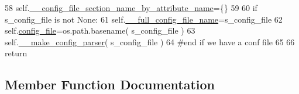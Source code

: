 \begin{DoxyCode}
58         self.\hyperlink{classnegui_1_1pginputsimupop_1_1PGInputSimuPop_acd9740f17e53a6e471d4e85565962369}{\_\_config\_file\_section\_name\_by\_attribute\_name}=\{\}
59 
60         \textcolor{keywordflow}{if} s\_config\_file \textcolor{keywordflow}{is} \textcolor{keywordflow}{not} \textcolor{keywordtype}{None}:
61             self.\hyperlink{classnegui_1_1pginputsimupop_1_1PGInputSimuPop_ad7c3feef55c16989a35f56c3e0d9943e}{\_\_full\_config\_file\_name}=s\_config\_file
62             self.\hyperlink{classnegui_1_1pginputsimupop_1_1PGInputSimuPop_af82bde7e564aee524fc30f2e06fde934}{config\_file}=os.path.basename( s\_config\_file )
63             self.\hyperlink{classnegui_1_1pginputsimupop_1_1PGInputSimuPop_a0b34c99730e86de268c5503ed226d15e}{\_\_make\_config\_parser}( s\_config\_file )
64         \textcolor{comment}{#end if we have a conf file}
65 
66         \textcolor{keywordflow}{return}
\end{DoxyCode}


\subsection{Member Function Documentation}
